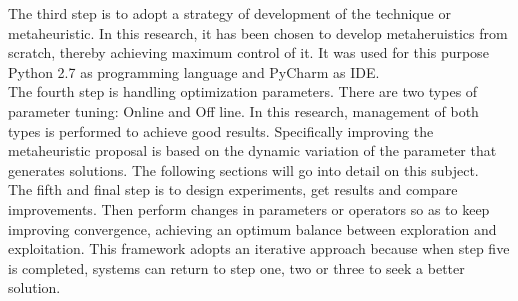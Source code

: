 The third step is to adopt a strategy of development of the technique or metaheuristic. In this research, it has been chosen to develop metaheruistics from scratch, thereby achieving maximum control of it. It was used for this purpose Python 2.7 as programming language and  PyCharm as IDE.\\

The fourth step is handling optimization parameters. There are two types of parameter tuning: Online and Off line. In this research, management of both types is performed to achieve good results. Specifically improving the metaheuristic proposal is based on the dynamic variation of the parameter that generates solutions. The following sections will go into detail on this subject.\\

The fifth and final step is to design experiments, get results and compare improvements. Then perform changes in parameters or operators so as to keep improving convergence, achieving an optimum balance between exploration and exploitation. This framework adopts an iterative approach because when step five is completed, systems can return to step one, two or three to seek a better solution.